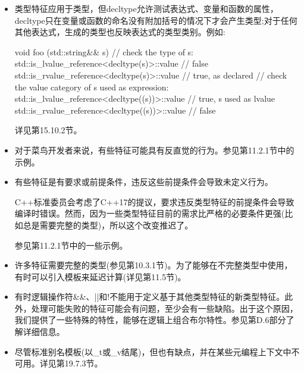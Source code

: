 \begin{itemize}
\item 
类型特征应用于类型，但decltype允许测试表达式、变量和函数的属性，decltype只在变量或函数的命名没有附加括号的情况下才会产生类型;对于任何其他表达式，生成的类型也反映表达式的类型类别。例如:

\begin{cpp}
void foo (std::string&& s)
{
	// check the type of s:
	std::is_lvalue_reference<decltype(s)>::value // false
	std::is_rvalue_reference<decltype(s)>::value // true, as declared
	// check the value category of s used as expression:
	std::is_lvalue_reference<decltype((s))>::value // true, s used as lvalue
	std::is_rvalue_reference<decltype((s))>::value // false
}
\end{cpp}

详见第15.10.2节。

\item 
对于菜鸟开发者来说，有些特征可能具有反直觉的行为。参见第11.2.1节中的示例。

\item 
有些特征是有要求或前提条件，违反这些前提条件会导致未定义行为。

\begin{notice}
C++标准委员会考虑了C++17的提议，要求违反类型特征的前提条件会导致编译时错误。然而，因为一些类型特征目前的需求比严格的必要条件更强(比如总是需要完整的类型)，所以这个改变推迟了。
\end{notice}

参见第11.2.1节中的一些示例。

\item 
许多特征需要完整的类型(参见第10.3.1节)。为了能够在不完整类型中使用，有时可以引入模板来延迟计算(详见第11.5节)。

\item 
有时逻辑操作符\&\&、||和!不能用于定义基于其他类型特征的新类型特征。此外，处理可能失败的特征可能会有问题，至少会有一些缺陷。出于这个原因，我们提供了一些特殊的特性，能够在逻辑上组合布尔特性。参见第D.6部分了解详细信息。

\item 
尽管标准别名模板(以\_t或\_v结尾)，但也有缺点，并在某些元编程上下文中不可用。详见第19.7.3节。
\end{itemize}



